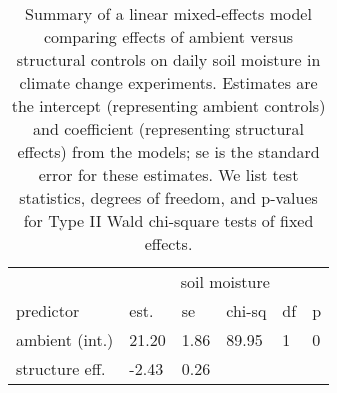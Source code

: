 \documentclass{article}
\begin{document}
\begin{table}[ht]
\centering
\caption{Summary of a linear mixed-effects model comparing effects of ambient versus structural controls on daily soil moisture in climate change experiments. Estimates are the intercept (representing ambient controls) and coefficient (representing structural effects) from the models; se is the standard error for these estimates. We list test statistics, degrees of freedom, and p-values for Type II Wald chi-square tests of fixed effects.} 
\label{table:shamamb_soilmois}
\begin{tabular}{|p{}|p{}p{}p{}p{}p{}|}
  \hline
  &\multicolumn{5}{c}{soil moisture}\\
 predictor & est. & se & chi-sq & df & p\\
 \hline
ambient (int.) & 21.20 & 1.86 & 89.95 & 1 & 0 \\ 
  structure eff. & -2.43 & 0.26 &  &  &  \\ 
   \hline
\end{tabular}
\end{table}\clearpage
\end{document}
